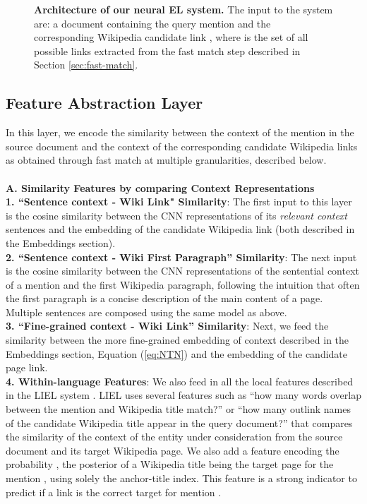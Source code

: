 \documentclass[letterpaper]{article} \usepackage{aaai18}  \usepackage{times}  \usepackage{helvet}  \usepackage{courier}  \usepackage{url}  \usepackage{graphicx}  \frenchspacing  \setlength{\pdfpagewidth}{8.5in}  \setlength{\pdfpageheight}{11in}  \usepackage{latexsym}
\begin{document}
\begin{figure}[t]
\begin{center}
\end{center}
\caption{\textbf{Architecture of our neural EL system.} The input to the system are: a document  containing the query mention  and the corresponding Wikipedia candidate link , where  is the set of all possible links extracted from the fast match step described in Section \ref{sec:fast-match}.}
\label{fig:nn-model}
\end{figure}


\subsection{Feature Abstraction Layer}
\label{sec:feature-layer}
In this layer, we encode the similarity between the context of the mention in the source document and the context of the corresponding candidate Wikipedia links as obtained through fast match at multiple granularities, described below. \\\\
\textbf{A. Similarity Features by comparing Context Representations}\\
\textbf{1. ``Sentence context - Wiki Link" Similarity}:
The first input to this layer is the cosine similarity between the CNN representations of its \emph{relevant context} sentences and the embedding of the candidate Wikipedia link (both described in the Embeddings section).\\ 
\textbf{2. ``Sentence context - Wiki First Paragraph'' Similarity}: The next input is the cosine similarity between the CNN representations of the sentential context of a mention and the first Wikipedia paragraph, following the intuition that often the first paragraph is a concise description of the main content of a page. Multiple sentences are composed using the same model as above.\\
\textbf{3. ``Fine-grained context - Wiki Link'' Similarity}:
Next, we feed the similarity between the more fine-grained embedding of context described in the Embeddings section, Equation (\ref{eq:NTN}) and the embedding of the candidate page link.\\
\textbf{4. Within-language Features}: We also feed in all the local features described in the LIEL system \cite{sil2016one}. LIEL uses several features such as ``how many words overlap between the mention and Wikipedia title match?'' or ``how many outlink names of the candidate Wikipedia title appear in the query document?'' that compares the similarity of the context of the entity under consideration from the source document and its target Wikipedia page. We also add a feature encoding the probability , the posterior of a Wikipedia title  being the target page for the mention , using solely the anchor-title index. This feature is a strong indicator to predict if a link  is the correct target for mention .\\
\end{document}
